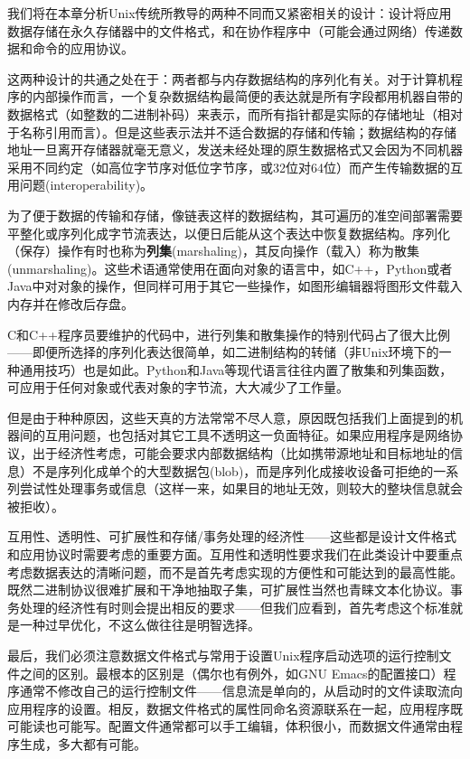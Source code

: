 \documentclass[11pt,oneside]{book}
\begin{document}
\begin{common-format}
我们将在本章分析Unix传统所教导的两种不同而又紧密相关的设计：设计将应用数据存储在永久存储器中的文件格式，和在协作程序中（可能会通过网络）传递数据和命令的应用协议。

这两种设计的共通之处在于：两者都与内存数据结构的序列化有关。对于计算机程序的内部操作而言，一个复杂数据结构最简便的表达就是所有字段都用机器自带的数据格式（如整数的二进制补码）来表示，而所有指针都是实际的存储地址（相对于名称引用而言）。但是这些表示法并不适合数据的存储和传输；数据结构的存储地址一旦离开存储器就毫无意义，发送未经处理的原生数据格式又会因为不同机器采用不同约定（如高位字节序对低位字节序，或32位对64位）而产生传输数据的互用问题(interoperability)。

为了便于数据的传输和存储，像链表这样的数据结构，其可遍历的准空间部署需要平整化或序列化成字节流表达，以便日后能从这个表达中恢复数据结构。序列化（保存）操作有时也称为\textbf{列集}(marshaling)，其反向操作（载入）称为散集(unmarshaling)。这些术语通常使用在面向对象的语言中，如C++，Python或者Java中对对象的操作，但同样可用于其它一些操作，如图形编辑器将图形文件载入内存并在修改后存盘。

C和C++程序员要维护的代码中，进行列集和散集操作的特别代码占了很大比例——即便所选择的序列化表达很简单，如二进制结构的转储（非Unix环境下的一种通用技巧）也是如此。Python和Java等现代语言往往内置了散集和列集函数，可应用于任何对象或代表对象的字节流，大大减少了工作量。

但是由于种种原因，这些天真的方法常常不尽人意，原因既包括我们上面提到的机器间的互用问题，也包括对其它工具不透明这一负面特征。如果应用程序是网络协议，出于经济性考虑，可能会要求内部数据结构（比如携带源地址和目标地址的信息）不是序列化成单个的大型数据包(blob)，而是序列化成接收设备可拒绝的一系列尝试性处理事务或信息（这样一来，如果目的地址无效，则较大的整块信息就会被拒收）。

互用性、透明性、可扩展性和存储/事务处理的经济性——这些都是设计文件格式和应用协议时需要考虑的重要方面。互用性和透明性要求我们在此类设计中要重点考虑数据表达的清晰问题，而不是首先考虑实现的方便性和可能达到的最高性能。既然二进制协议很难扩展和干净地抽取子集，可扩展性当然也青睐文本化协议。事务处理的经济性有时则会提出相反的要求——但我们应看到，首先考虑这个标准就是一种过早优化，不这么做往往是明智选择。

最后，我们必须注意数据文件格式与常用于设置Unix程序启动选项的运行控制文件之间的区别。最根本的区别是（偶尔也有例外，如GNU Emacs的配置接口）程序通常不修改自己的运行控制文件——信息流是单向的，从启动时的文件读取流向应用程序的设置。相反，数据文件格式的属性同命名资源联系在一起，应用程序既可能读也可能写。配置文件通常都可以手工编辑，体积很小，而数据文件通常由程序生成，多大都有可能。


\end{common-format}
\end{document}
